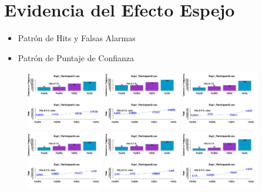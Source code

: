 










\section{Evidencia del Efecto Espejo}

\begin{itemize}
\item Patrón de Hits y Falsas Alarmas
\item Patrón de Puntaje de Confianza
\end{itemize}

\begin{figure}[th]
\centering
\includegraphics[width=0.30\textwidth]{Figures/MirrorRate_Exp1_P1} \includegraphics[width=0.30\textwidth]{Figures/MirrorRate_Exp1_P2} \includegraphics[width=0.30\textwidth]{Figures/MirrorRate_Exp1_P3}
\includegraphics[width=0.30\textwidth]{Figures/MirrorRate_Exp1_P4} \includegraphics[width=0.30\textwidth]{Figures/MirrorRate_Exp1_P5} \includegraphics[width=0.30\textwidth]{Figures/MirrorRate_Exp1_P6}

\end{figure}
